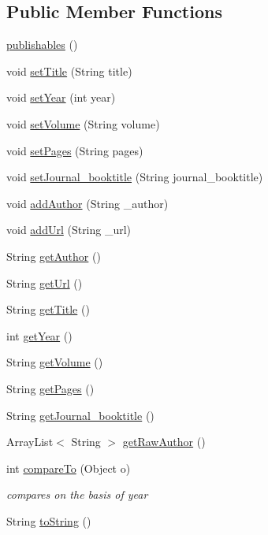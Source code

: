 \subsection*{Public Member Functions}
\begin{DoxyCompactItemize}
\item 
\hyperlink{class_data_1_1publishables_aceabba690b9f11b724b7ca0bb1bd6ed9}{publishables} ()
\item 
void \hyperlink{class_data_1_1publishables_a3d53c9a74e1dad13a2f12b7c4e521956}{set\+Title} (String title)
\item 
void \hyperlink{class_data_1_1publishables_aa1ccf268dc89410fa9ab554470c66817}{set\+Year} (int year)
\item 
void \hyperlink{class_data_1_1publishables_ad75ef8fda848ce0c92bd3a0cffbb7cd5}{set\+Volume} (String volume)
\item 
void \hyperlink{class_data_1_1publishables_a5f50216c1c3ec50ec46fb866ee3aa584}{set\+Pages} (String pages)
\item 
void \hyperlink{class_data_1_1publishables_a735b41a8df635fd719eae7927ed81329}{set\+Journal\+\_\+booktitle} (String journal\+\_\+booktitle)
\item 
void \hyperlink{class_data_1_1publishables_afefb90428e6d1ce4f699b4a4a10da4fa}{add\+Author} (String \+\_\+author)
\item 
void \hyperlink{class_data_1_1publishables_a1ab3287a7eada2b725f7e1d735d235fa}{add\+Url} (String \+\_\+url)
\item 
String \hyperlink{class_data_1_1publishables_adb157b10f5a2a4fb9a842cc85e32f54b}{get\+Author} ()
\item 
String \hyperlink{class_data_1_1publishables_a8e829e500e2f0aa65e57c344cc1afb7c}{get\+Url} ()
\item 
String \hyperlink{class_data_1_1publishables_a8b14020ff568a02776ffe674eac0fcba}{get\+Title} ()
\item 
int \hyperlink{class_data_1_1publishables_a75f9f918753d279ce0eb81e4956931df}{get\+Year} ()
\item 
String \hyperlink{class_data_1_1publishables_a6b3f36e7f557b5d3fc7c44d6975318a2}{get\+Volume} ()
\item 
String \hyperlink{class_data_1_1publishables_af657673a106cc994008f104f62f639ba}{get\+Pages} ()
\item 
String \hyperlink{class_data_1_1publishables_a7a83ab5278085e3fb9ea8f5b57860b0d}{get\+Journal\+\_\+booktitle} ()
\item 
Array\+List$<$ String $>$ \hyperlink{class_data_1_1publishables_a309ee4a6e0475636adf30390f9edfb10}{get\+Raw\+Author} ()
\item 
int \hyperlink{class_data_1_1publishables_a05a1e076d45e561c6e3d3f745849f650}{compare\+To} (Object o)
\begin{DoxyCompactList}\small\item\em compares on the basis of year \end{DoxyCompactList}\item 
String \hyperlink{class_data_1_1publishables_a61c53fb0b33bffd164b4cbba2b5add43}{to\+String} ()
\end{DoxyCompactItemize}



